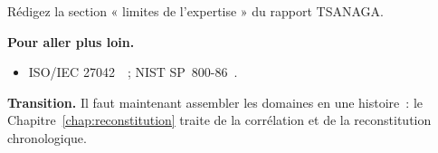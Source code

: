 \begin{boxexo}[title={\ding{45}\quad Exercice~16.10. Note de limites \niveauexpert}]
Rédigez la section « limites de l'expertise » du rapport TSANAGA.
\end{boxexo}

\bigskip

\begin{boxinfo}
\textbf{Pour aller plus loin.}
\begin{itemize}
    \item ISO/IEC 27042~\cite{iso27042}~; NIST SP~800-86~\cite{nist80086}.
\end{itemize}
\end{boxinfo}

\begin{boxinfo}
\textbf{Transition.} Il faut maintenant assembler les domaines en une
histoire~: le Chapitre~\ref{chap:reconstitution} traite de la corrélation et
de la reconstitution chronologique.
\end{boxinfo}
